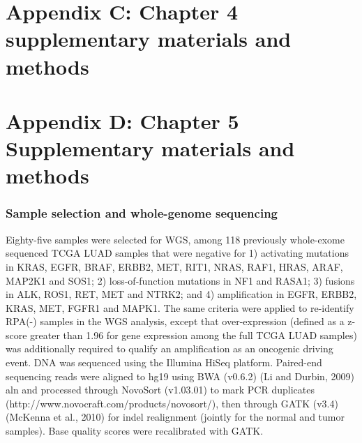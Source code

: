 \documentclass[phd,tocprelim]{cornell}
\begin{document}
\chapter*{Appendix C: Chapter 4 supplementary materials and methods}


\chapter*{Appendix D: Chapter 5 Supplementary materials and methods}
\subsection*{Sample selection and whole-genome sequencing}
Eighty-five samples were selected for WGS, among 118 previously whole-exome sequenced TCGA LUAD samples that were negative for 1) activating mutations in KRAS, EGFR, BRAF, ERBB2, MET, RIT1, NRAS, RAF1, HRAS, ARAF, MAP2K1 and SOS1; 2) loss-of-function mutations in NF1 and RASA1; 3) fusions in ALK, ROS1, RET, MET and NTRK2; and 4) amplification in EGFR, ERBB2, KRAS, MET, FGFR1 and MAPK1. The same criteria were applied to re-identify RPA(-) samples in the WGS analysis, except that over-expression (defined as a z-score greater than 1.96 for gene expression among the full TCGA LUAD samples) was additionally required to qualify an amplification as an oncogenic driving event. 
DNA was sequenced using the Illumina HiSeq platform. Paired-end sequencing reads were aligned to hg19 using BWA (v0.6.2) (Li and Durbin, 2009) aln and processed through NovoSort (v1.03.01) to mark PCR duplicates (http://www.novocraft.com/products/novosort/), then through GATK (v3.4) (McKenna et al., 2010) for indel realignment (jointly for the normal and tumor samples). Base quality scores were recalibrated with GATK.
\end{document}
